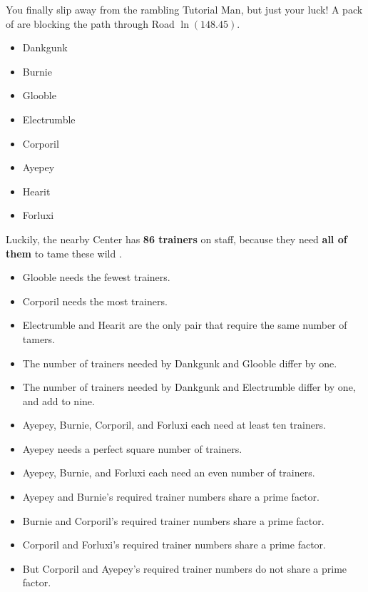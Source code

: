 

You finally slip away from the rambling Tutorial Man, but just your luck!
A pack of \mappMobimon{} are blocking the path
through Road \(\ln(148.45)\).

\begin{multicols}{2}
\begin{itemize}
  \item {Dankgunk}
  \item {Burnie}
  \item {Glooble}
  \item {Electrumble}
  \item {Corporil}
  \item {Ayepey}
  \item {Hearit}
  \item {Forluxi}
\end{itemize}
\end{multicols}

Luckily, the nearby \mappMobimon{} Center has \textbf{86 trainers} on staff,
because they need \textbf{all of them} to tame these wild \mappMobimon{}.

\begin{multicols}{2}
\begin{itemize}
\item Glooble needs the fewest trainers.
\item Corporil needs the most trainers.
\item Electrumble and Hearit are the only pair that require
      the same number of tamers.
\item The number of trainers needed by Dankgunk and Glooble differ by one.
\item The number of trainers needed by Dankgunk and Electrumble differ by one,
      and add to nine.
\item Ayepey, Burnie, Corporil, and Forluxi each need at least ten
      trainers.
\item Ayepey needs a perfect square number of trainers.
\item Ayepey, Burnie, and Forluxi each need an even number of trainers.
\item Ayepey and Burnie's required trainer numbers share a prime factor.
\item Burnie and Corporil's required trainer numbers share a prime factor.
\item Corporil and Forluxi's required trainer numbers share a prime factor.
\item But Corporil and Ayepey's required trainer numbers do not
      share a prime factor.
\end{itemize}
\end{multicols}

